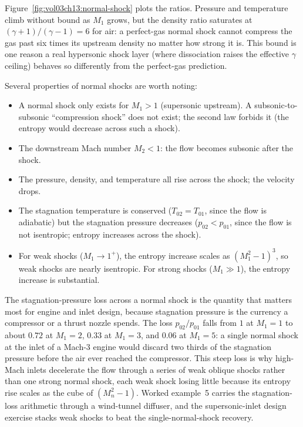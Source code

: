 Figure~\ref{fig:vol03ch13:normal-shock} plots the ratios.
Pressure and temperature climb without bound as $M_1$ grows, but the
density ratio saturates at $(\gamma+1)/(\gamma-1) = 6$ for air: a
perfect-gas normal shock cannot compress the gas past six times its
upstream density no matter how strong it is. This bound is one reason
a real hypersonic shock layer (where dissociation raises the effective
$\gamma$ ceiling) behaves so differently from the perfect-gas
prediction.

Several properties of normal shocks are worth noting:

\begin{itemize}[leftmargin=*]
  \item A normal shock only exists for $M_1 > 1$ (supersonic
    upstream). A subsonic-to-subsonic ``compression shock'' does
    not exist; the second law forbids it (the entropy would
    decrease across such a shock).
  \item The downstream Mach number $M_2 < 1$: the flow becomes
    subsonic after the shock.
  \item The pressure, density, and temperature all rise across the
    shock; the velocity drops.
  \item The stagnation temperature is conserved ($T_{02} = T_{01}$,
    since the flow is adiabatic) but the stagnation pressure
    decreases ($p_{02} < p_{01}$, since the flow is not
    isentropic; entropy increases across the shock).
  \item For weak shocks ($M_1 \to 1^+$), the entropy increase
    scales as $(M_1^2 - 1)^3$, so weak shocks are nearly
    isentropic. For strong shocks ($M_1 \gg 1$), the entropy
    increase is substantial.
\end{itemize}

The stagnation-pressure loss across a normal shock is the quantity that
matters most for engine and inlet design, because stagnation pressure
is the currency a compressor or a thrust nozzle spends. The loss
$p_{02}/p_{01}$ falls from $1$ at $M_1 = 1$ to about $0.72$ at
$M_1 = 2$, $0.33$ at $M_1 = 3$, and $0.06$ at $M_1 = 5$: a single
normal shock at the inlet of a Mach-3 engine would discard two thirds
of the stagnation pressure before the air ever reached the compressor.
This steep loss is why high-Mach inlets decelerate the flow through a
series of weak oblique shocks rather than one strong normal shock, each
weak shock losing little because its entropy rise scales as the cube of
$(M_n^2 - 1)$. Worked example~5 carries the stagnation-loss arithmetic
through a wind-tunnel diffuser, and the supersonic-inlet design
exercise stacks weak shocks to beat the single-normal-shock recovery.

